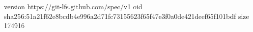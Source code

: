 version https://git-lfs.github.com/spec/v1
oid sha256:51a21f62e8bcdb4e996a2d71fc73155623f65f47e3f0a0de421deef65f101bdf
size 174916
